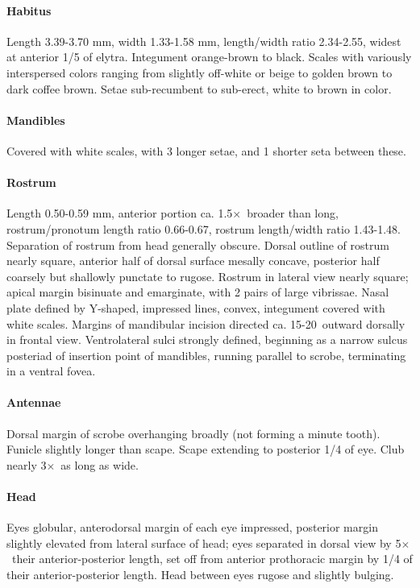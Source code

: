 \documentclass[fleqn,10pt,lineno]{wlpeerj} %
\newcommand{\td}{\textdegree~}
\newcommand{\x}{$\times$~}
\begin{document}
			\paragraph{Habitus}
				Length 3.39-3.70 mm, width 1.33-1.58 mm, length/width ratio 2.34-2.55, widest at anterior 1/5 of elytra.
				Integument orange-brown to black.
				Scales with variously interspersed colors ranging from slightly off-white or beige to golden brown to dark coffee brown.
				Setae sub-recumbent to sub-erect, white to brown in color.
			\paragraph{Mandibles}
				Covered with white scales, with 3 longer setae, and 1 shorter seta between these.
			\paragraph{Rostrum}
				Length 0.50-0.59 mm, anterior portion ca. 1.5\x broader than long, rostrum/pronotum length ratio 0.66-0.67, rostrum length/width ratio 1.43-1.48.
				Separation of rostrum from head generally obscure. 
				Dorsal outline of rostrum nearly square, anterior half of dorsal surface mesally concave, posterior half coarsely but shallowly punctate to rugose. 
				Rostrum in lateral view nearly square; apical margin bisinuate and emarginate, with 2 pairs of large vibrissae. 
				Nasal plate defined by Y-shaped, impressed lines, convex, integument covered with white scales.
				Margins of mandibular incision directed ca. 15-20\td outward dorsally in frontal view. 
				Ventrolateral sulci strongly defined, beginning as a narrow sulcus posteriad of insertion point of mandibles, running parallel to scrobe, terminating in a ventral fovea.
			\paragraph{Antennae}
				Dorsal margin of scrobe overhanging broadly (not forming a minute tooth).
				Funicle slightly longer than scape.
				Scape extending to posterior 1/4 of eye.
				Club nearly 3\x as long as wide.
			\paragraph{Head}
				Eyes globular, anterodorsal margin of each eye impressed, posterior margin slightly elevated from lateral surface of head; eyes separated in dorsal view by 5\x their anterior-posterior length, set off from anterior prothoracic margin by 1/4 of their anterior-posterior length.
				Head between eyes rugose and slightly bulging.
\end{document}
